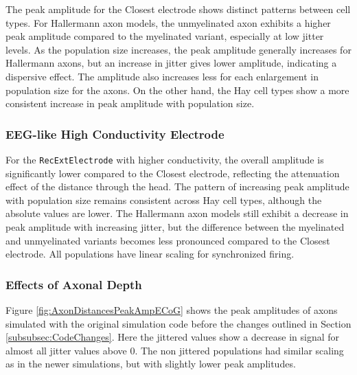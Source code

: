 \documentclass[final, a4paper,masters,en,listoffigures,listoftables,norwegiandates]{NMBU}
\begin{document}
The peak amplitude for the Closest electrode shows distinct patterns between cell types. For Hallermann axon models, the unmyelinated axon exhibits a higher peak amplitude compared to the myelinated variant, especially at low jitter levels. As the population size increases, the peak amplitude generally increases for Hallermann axons, but an increase in jitter gives lower amplitude, indicating a dispersive effect. The amplitude also increases less for each enlargement in population size for the axons. On the other hand, the Hay cell types show a more consistent increase in peak amplitude with population size.

\subsubsection{EEG-like High Conductivity Electrode}

For the \texttt{RecExtElectrode} with higher conductivity, the overall amplitude is significantly lower compared to the Closest electrode, reflecting the attenuation effect of the distance through the head. The pattern of increasing peak amplitude with population size remains consistent across Hay cell types, although the absolute values are lower. The Hallermann axon models still exhibit a decrease in peak amplitude with increasing jitter, but the difference between the myelinated and unmyelinated variants becomes less pronounced compared to the Closest electrode. All populations have linear scaling for synchronized firing. 


\subsubsection{Effects of Axonal Depth} \label{subsubsec:depth}
Figure \ref{fig:AxonDistancesPeakAmpECoG} shows the peak amplitudes of axons simulated with the original simulation code before the changes outlined in Section \ref{subsubsec:CodeChanges}. Here the jittered values show a decrease in signal for almost all jitter values above 0. The non jittered populations had similar scaling as in the newer simulations, but with slightly lower peak amplitudes. 
\end{document}

